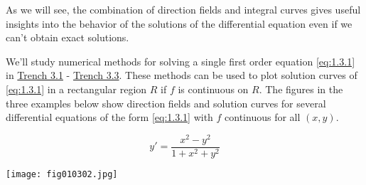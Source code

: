 \documentclass{ximera}
\begin{document}
 
As we will  see, the combination of  direction fields and
 integral curves gives  useful insights into the behavior of
the solutions of the differential equation even if
we can't obtain exact solutions.
 
We'll study numerical methods for solving a single first order
equation \eqref{eq:1.3.1} in \href{https://ximera.osu.edu/ode/main/eulersMethod/eulersMethod}{Trench 3.1} - \href{https://ximera.osu.edu/ode/main/rungeKutta/rungeKutta}{Trench 3.3}. These methods can be
used
to plot solution curves of \eqref{eq:1.3.1} in a rectangular region $R$ if $f$ is continuous on $R$. The figures in the three examples below show direction fields and solution
curves for several differential equations of the form \eqref{eq:1.3.1} with $f$
 continuous for all $(x,y)$.
 \begin{example}\label{ex:fig010302}
$$
 y'=\frac{x^2-y^2}{1+x^2+y^2}
 $$
\begin{image}
  \texttt{[image: fig010302.jpg]}
\end{image}
\end{example}
 
\end{document}

